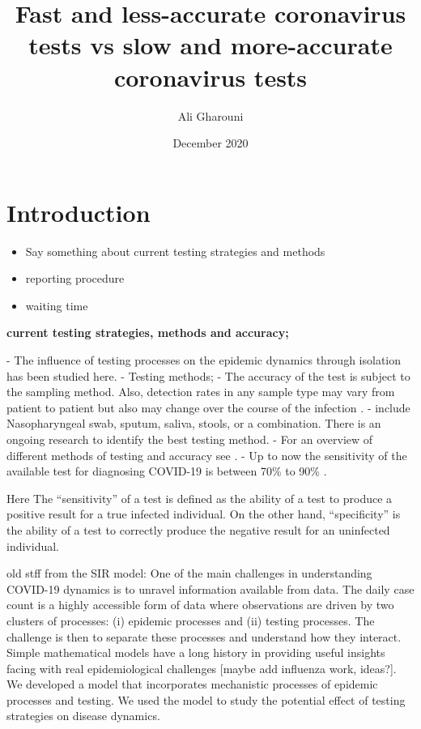 \documentclass{article}
\title{Fast and less-accurate coronavirus tests vs slow and more-accurate coronavirus tests }
\author{Ali Gharouni}
\date{December 2020}
\theoremstyle{definition} %
\begin{document}
\maketitle
\section{Introduction}
\begin{itemize}
  \item Say something about current testing strategies and methods
  \item reporting procedure
  \item waiting time
\end{itemize}



{\bf current testing strategies, methods and accuracy;}

- The influence of testing processes on the epidemic dynamics through isolation has been studied here.
- Testing methods;
    - The accuracy of the test is subject to the sampling method. Also, detection rates in any sample type may vary from patient to patient but also may change over the course of the infection \citep{patel2020report}.
    - include Nasopharyngeal swab, sputum, saliva, stools, or a combination. There is an ongoing research to identify the best testing method.
    - For an overview of different methods of testing and accuracy see \cite{machado2021main}.
    - Up to now the sensitivity of the available test for diagnosing COVID-19 is between 70\% to 90\% \citep{woloshin2020false}.


Here The ``sensitivity'' of a test is defined as the ability of a test to produce a positive result for a true infected individual. On the other hand, ``specificity'' is the ability of a test to correctly produce the negative result for an uninfected individual.  








old stff from the SIR model:
One of the main challenges in understanding COVID-19 dynamics is to unravel information available from data. The daily case count is a highly accessible form of data where observations are driven by two clusters of processes: (i) epidemic processes and (ii) testing processes. The challenge is then to separate these processes and understand how they interact. Simple mathematical models have a long history in providing useful insights facing with real epidemiological challenges \citep{ross1911prevention} [maybe add influenza work, ideas?]. We developed a model that incorporates mechanistic processes of epidemic processes and testing. We used the model to study the potential effect of testing strategies on disease dynamics.
\end{document}
